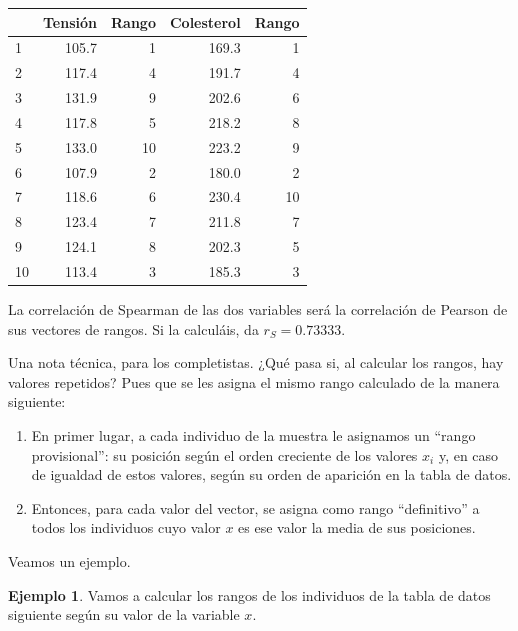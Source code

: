 \documentclass[
]{book}
\providecommand{\tightlist}{%
  \setlength{\itemsep}{0pt}\setlength{\parskip}{0pt}}
\theoremstyle{definition}
\theoremstyle{definition}
\newtheorem{example}{Ejemplo}[chapter]
\theoremstyle{definition}
\theoremstyle{definition}
\theoremstyle{remark}
\begin{document}
\begin{table}
\centering
\begin{tabular}{l|r|r|r|r}
\hline
  & Tensión & Rango & Colesterol & Rango\\
\hline
1 & 105.7 & 1 & 169.3 & 1\\
\hline
2 & 117.4 & 4 & 191.7 & 4\\
\hline
3 & 131.9 & 9 & 202.6 & 6\\
\hline
4 & 117.8 & 5 & 218.2 & 8\\
\hline
5 & 133.0 & 10 & 223.2 & 9\\
\hline
6 & 107.9 & 2 & 180.0 & 2\\
\hline
7 & 118.6 & 6 & 230.4 & 10\\
\hline
8 & 123.4 & 7 & 211.8 & 7\\
\hline
9 & 124.1 & 8 & 202.3 & 5\\
\hline
10 & 113.4 & 3 & 185.3 & 3\\
\hline
\end{tabular}
\end{table}

La correlación de Spearman de las dos variables será la correlación de Pearson de sus vectores de rangos. Si la calculáis, da \({r_S}=0.73333\).

\begin{rmdnote}
Una nota técnica, para los completistas. ¿Qué pasa si, al calcular los rangos, hay valores repetidos? Pues que se les asigna el mismo rango calculado de la manera siguiente:

\begin{enumerate}
\def\labelenumi{\arabic{enumi}.}
\tightlist
\item
  En primer lugar, a cada individuo de la muestra le asignamos un ``rango provisional'': su posición según el orden creciente de los valores \(x_i\) y, en caso de igualdad de estos valores, según su orden de aparición en la tabla de datos.
\item
  Entonces, para cada valor del vector, se asigna como rango ``definitivo'' a todos los individuos cuyo valor \(x\) es ese valor la media de sus posiciones.
\end{enumerate}
\end{rmdnote}

Veamos un ejemplo.

\begin{example}
\protect\hypertarget{exm:unnamed-chunk-321}{}\label{exm:unnamed-chunk-321}Vamos a calcular los rangos de los individuos de la tabla de datos siguiente según su valor de la variable \(x\).
\end{example}
\end{document}

